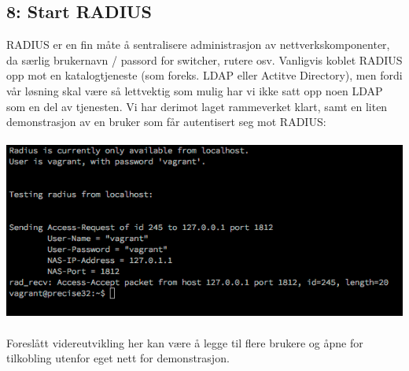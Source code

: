 \documentclass{article}
\begin{document}
\subsection{8: Start RADIUS}
RADIUS er en fin måte å sentralisere administrasjon av nettverkskomponenter, da særlig brukernavn / passord for switcher, rutere osv. Vanligvis koblet RADIUS opp mot en katalogtjeneste (som foreks. LDAP eller Actitve Directory), men fordi vår løsning skal være så lettvektig som mulig har vi ikke satt opp noen LDAP som en del av tjenesten. Vi har derimot laget rammeverket klart, samt en liten demonstrasjon av en bruker som får autentisert seg mot RADIUS:
\\ 
\\
\includegraphics[scale = 0.7]{pictures/radius.png}
\\ 
\\
Foreslått videreutvikling her kan være å legge til flere brukere og åpne for tilkobling utenfor eget nett for demonstrasjon.
\end{document}
